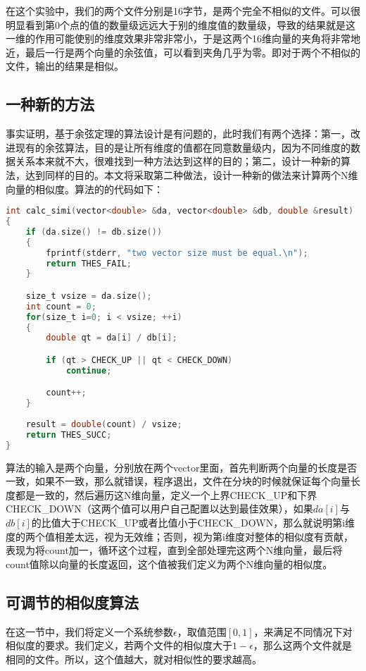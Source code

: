 在这个实验中，我们的两个文件分别是16字节，是两个完全不相似的文件。可以很明显看到第0个点的值的数量级远远大于别的维度值的数量级，导致的结果就是这一维的作用可能使别的维度效果非常非常小，于是这两个16维向量的夹角将非常地近，最后一行是两个向量的余弦值，可以看到夹角几乎为零。即对于两个不相似的文件，输出的结果是相似。

\subsection{一种新的方法}

事实证明，基于余弦定理的算法设计是有问题的，此时我们有两个选择：第一，改进现有的余弦算法，目的是让所有维度的值都在同意数量级内，因为不同维度的数据关系本来就不大，很难找到一种方法达到这样的目的；第二，设计一种新的算法，达到同样的目的。本文将采取第二种做法，设计一种新的做法来计算两个N维向量的相似度。算法的的代码如下：

\begin{lstlisting}[language={C}, caption={检测两个N维向量的相似度}]
int calc_simi(vector<double> &da, vector<double> &db, double &result)
{
    if (da.size() != db.size())
    {
        fprintf(stderr, "two vector size must be equal.\n");
        return THES_FAIL;
    }

    size_t vsize = da.size();
    int count = 0;
    for(size_t i=0; i < vsize; ++i)
    {
        double qt = da[i] / db[i];

        if (qt > CHECK_UP || qt < CHECK_DOWN)
            continue;

        count++;
    }
    
    result = double(count) / vsize;
    return THES_SUCC;
}
\end{lstlisting}
算法的输入是两个向量，分别放在两个vector里面，首先判断两个向量的长度是否一致，如果不一致，那么就错误，程序退出，文件在分块的时候就保证每个向量长度都是一致的，然后遍历这N维向量，定义一个上界CHECK\_UP和下界CHECK\_DOWN（这两个值可以用户自己配置以达到最佳效果），如果$da[i]$与$db[i]$的比值大于CHECK\_UP或者比值小于CHECK\_DOWN，那么就说明第i维度的两个值相差太远，视为无效维；否则，视为第i维度对整体的相似度有贡献，表现为将count加一，循环这个过程，直到全部处理完这两个N维向量，最后将count值除以向量的长度返回，这个值被我们定义为两个N维向量的相似度。

\subsection{可调节的相似度算法}

在这一节中，我们将定义一个系统参数$\epsilon$，取值范围$[0,1]$，来满足不同情况下对相似度的要求。我们定义，若两个文件的相似度大于$1-\epsilon$，那么这两个文件就是相同的文件。所以，这个值越大，就对相似性的要求越高。

